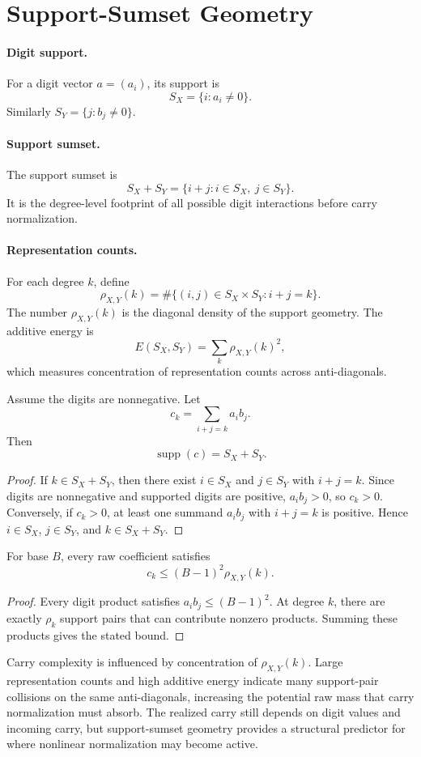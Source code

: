 \section{Support-Sumset Geometry}

\paragraph{Digit support.}
For a digit vector \(a=(a_i)\), its support is
\[
    S_X = \{i : a_i \ne 0\}.
\]
Similarly \(S_Y=\{j:b_j\ne 0\}\).

\paragraph{Support sumset.}
The support sumset is
\[
    S_X + S_Y = \{i+j : i\in S_X,\ j\in S_Y\}.
\]
It is the degree-level footprint of all possible digit interactions before
carry normalization.

\paragraph{Representation counts.}
For each degree \(k\), define
\[
    \rho_{X,Y}(k) = \#\{(i,j)\in S_X\times S_Y : i+j=k\}.
\]
The number \(\rho_{X,Y}(k)\) is the diagonal density of the support geometry. The
additive energy is
\[
    E(S_X,S_Y)=\sum_k \rho_{X,Y}(k)^2,
\]
which measures concentration of representation counts across anti-diagonals.

\begin{proposition}
Assume the digits are nonnegative. Let
\[
    c_k=\sum_{i+j=k} a_i b_j.
\]
Then
\[
    \operatorname{supp}(c)=S_X+S_Y.
\]
\end{proposition}

\begin{proof}
If \(k\in S_X+S_Y\), then there exist \(i\in S_X\) and \(j\in S_Y\) with
\(i+j=k\). Since digits are nonnegative and supported digits are positive,
\(a_i b_j>0\), so \(c_k>0\). Conversely, if \(c_k>0\), at least one summand
\(a_i b_j\) with \(i+j=k\) is positive. Hence \(i\in S_X\), \(j\in S_Y\),
and \(k\in S_X+S_Y\).
\end{proof}

\begin{proposition}
For base \(B\), every raw coefficient satisfies
\[
    c_k \le (B-1)^2 \rho_{X,Y}(k).
\]
\end{proposition}

\begin{proof}
Every digit product satisfies \(a_i b_j\le (B-1)^2\). At degree \(k\), there
are exactly \(\rho_k\) support pairs that can contribute nonzero products.
Summing these products gives the stated bound.
\end{proof}

Carry complexity is influenced by concentration of \(\rho_{X,Y}(k)\). Large
representation counts and high additive energy indicate many support-pair
collisions on the same anti-diagonals, increasing the potential raw mass that
carry normalization must absorb. The realized carry still depends on digit
values and incoming carry, but support-sumset geometry provides a structural
predictor for where nonlinear normalization may become active.
